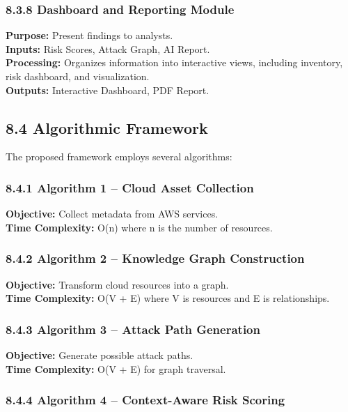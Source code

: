 \subsubsection{8.3.8 Dashboard and Reporting Module}

\textbf{Purpose:} Present findings to analysts.\\
\textbf{Inputs:} Risk Scores, Attack Graph, AI Report.\\
\textbf{Processing:} Organizes information into interactive views, including inventory, risk dashboard, and visualization.\\
\textbf{Outputs:} Interactive Dashboard, PDF Report.

\subsection{8.4 Algorithmic Framework}

The proposed framework employs several algorithms:

\subsubsection{8.4.1 Algorithm 1 -- Cloud Asset Collection}

\textbf{Objective:} Collect metadata from AWS services.\\
\textbf{Time Complexity:} O(n) where n is the number of resources.

\subsubsection{8.4.2 Algorithm 2 -- Knowledge Graph Construction}

\textbf{Objective:} Transform cloud resources into a graph.\\
\textbf{Time Complexity:} O(V + E) where V is resources and E is relationships.

\subsubsection{8.4.3 Algorithm 3 -- Attack Path Generation}

\textbf{Objective:} Generate possible attack paths.\\
\textbf{Time Complexity:} O(V + E) for graph traversal.

\subsubsection{8.4.4 Algorithm 4 -- Context-Aware Risk Scoring}

